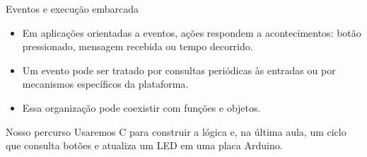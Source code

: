 \begin{frame}[t]{Eventos e execução embarcada}
\begin{itemize}
\item Em aplicações orientadas a eventos, ações respondem a acontecimentos: botão pressionado, mensagem recebida ou tempo decorrido.
\item Um evento pode ser tratado por consultas periódicas às entradas ou por mecanismos específicos da plataforma.
\item Essa organização pode coexistir com funções e objetos.
\end{itemize}
\begin{exampleblock}{Nosso percurso}
Usaremos C para construir a lógica e, na última aula, um ciclo que consulta botões e atualiza um LED em uma placa Arduino.
\end{exampleblock}
\end{frame}
